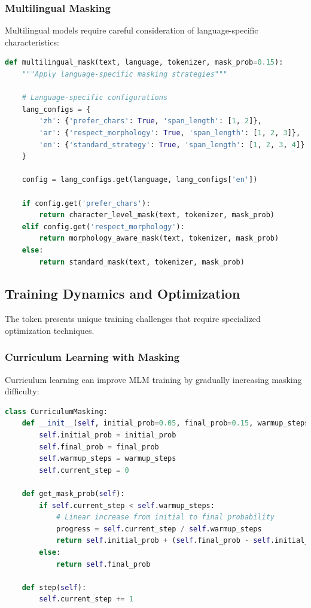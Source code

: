 \subsubsection{Multilingual Masking}

Multilingual models require careful consideration of language-specific characteristics:

\begin{lstlisting}[language=Python, caption=Language-aware masking]
def multilingual_mask(text, language, tokenizer, mask_prob=0.15):
    """Apply language-specific masking strategies"""
    
    # Language-specific configurations
    lang_configs = {
        'zh': {'prefer_chars': True, 'span_length': [1, 2]},
        'ar': {'respect_morphology': True, 'span_length': [1, 2, 3]},
        'en': {'standard_strategy': True, 'span_length': [1, 2, 3, 4]}
    }
    
    config = lang_configs.get(language, lang_configs['en'])
    
    if config.get('prefer_chars'):
        return character_level_mask(text, tokenizer, mask_prob)
    elif config.get('respect_morphology'):
        return morphology_aware_mask(text, tokenizer, mask_prob)
    else:
        return standard_mask(text, tokenizer, mask_prob)
\end{lstlisting}

\subsection{Training Dynamics and Optimization}

The \mask{} token presents unique training challenges that require specialized optimization techniques.

\subsubsection{Curriculum Learning with Masking}

Curriculum learning can improve MLM training by gradually increasing masking difficulty:

\begin{lstlisting}[language=Python, caption=Curriculum masking]
class CurriculumMasking:
    def __init__(self, initial_prob=0.05, final_prob=0.15, warmup_steps=10000):
        self.initial_prob = initial_prob
        self.final_prob = final_prob
        self.warmup_steps = warmup_steps
        self.current_step = 0
    
    def get_mask_prob(self):
        if self.current_step < self.warmup_steps:
            # Linear increase from initial to final probability
            progress = self.current_step / self.warmup_steps
            return self.initial_prob + (self.final_prob - self.initial_prob) * progress
        else:
            return self.final_prob
    
    def step(self):
        self.current_step += 1
\end{lstlisting}

